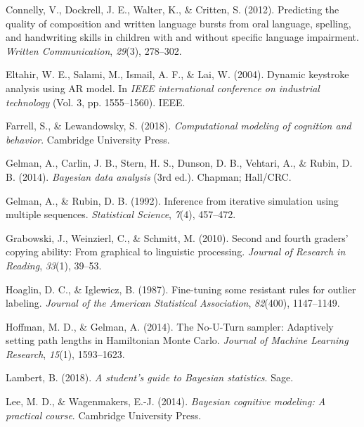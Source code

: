 \documentclass[english,jou,floatsintext]{apa7}
\begin{document}
\leavevmode\hypertarget{ref-connelly2012predicting}{}%
Connelly, V., Dockrell, J. E., Walter, K., \& Critten, S. (2012). Predicting the quality of composition and written language bursts from oral language, spelling, and handwriting skills in children with and without specific language impairment. \emph{Written Communication}, \emph{29}(3), 278--302.

\leavevmode\hypertarget{ref-eltahir2004dynamic}{}%
Eltahir, W. E., Salami, M., Ismail, A. F., \& Lai, W. (2004). Dynamic keystroke analysis using AR model. In \emph{IEEE international conference on industrial technology} (Vol. 3, pp. 1555--1560). IEEE.

\leavevmode\hypertarget{ref-farrell2018computational}{}%
Farrell, S., \& Lewandowsky, S. (2018). \emph{Computational modeling of cognition and behavior}. Cambridge University Press.

\leavevmode\hypertarget{ref-gelman2014}{}%
Gelman, A., Carlin, J. B., Stern, H. S., Dunson, D. B., Vehtari, A., \& Rubin, D. B. (2014). \emph{Bayesian data analysis} (3rd ed.). Chapman; Hall/CRC.

\leavevmode\hypertarget{ref-gelman1992}{}%
Gelman, A., \& Rubin, D. B. (1992). Inference from iterative simulation using multiple sequences. \emph{Statistical Science}, \emph{7}(4), 457--472.

\leavevmode\hypertarget{ref-grabowski2010second}{}%
Grabowski, J., Weinzierl, C., \& Schmitt, M. (2010). Second and fourth graders' copying ability: From graphical to linguistic processing. \emph{Journal of Research in Reading}, \emph{33}(1), 39--53.

\leavevmode\hypertarget{ref-hoaglin1987fine}{}%
Hoaglin, D. C., \& Iglewicz, B. (1987). Fine-tuning some resistant rules for outlier labeling. \emph{Journal of the American Statistical Association}, \emph{82}(400), 1147--1149.

\leavevmode\hypertarget{ref-hoffman2014no}{}%
Hoffman, M. D., \& Gelman, A. (2014). The No-U-Turn sampler: Adaptively setting path lengths in Hamiltonian Monte Carlo. \emph{Journal of Machine Learning Research}, \emph{15}(1), 1593--1623.

\leavevmode\hypertarget{ref-lambert2018student}{}%
Lambert, B. (2018). \emph{A student's guide to Bayesian statistics}. Sage.

\leavevmode\hypertarget{ref-lee2014bayesian}{}%
Lee, M. D., \& Wagenmakers, E.-J. (2014). \emph{Bayesian cognitive modeling: A practical course}. Cambridge University Press.
\end{document}
